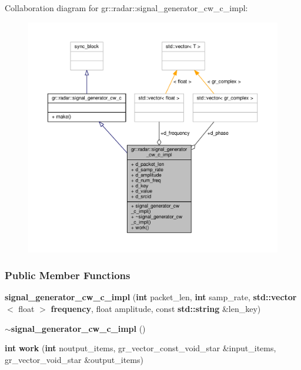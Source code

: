 Collaboration diagram for gr\+:\+:radar\+:\+:signal\+\_\+generator\+\_\+cw\+\_\+c\+\_\+impl\+:
\nopagebreak
\begin{figure}[H]
\begin{center}
\leavevmode
\includegraphics[width=350pt]{d3/d7e/classgr_1_1radar_1_1signal__generator__cw__c__impl__coll__graph}
\end{center}
\end{figure}
\subsubsection*{Public Member Functions}
\begin{DoxyCompactItemize}
\item 
{\bf signal\+\_\+generator\+\_\+cw\+\_\+c\+\_\+impl} ({\bf int} packet\+\_\+len, {\bf int} samp\+\_\+rate, {\bf std\+::vector}$<$ float $>$ {\bf frequency}, float amplitude, const {\bf std\+::string} \&len\+\_\+key)
\item 
{\bf $\sim$signal\+\_\+generator\+\_\+cw\+\_\+c\+\_\+impl} ()
\item 
{\bf int} {\bf work} ({\bf int} noutput\+\_\+items, gr\+\_\+vector\+\_\+const\+\_\+void\+\_\+star \&input\+\_\+items, gr\+\_\+vector\+\_\+void\+\_\+star \&output\+\_\+items)
\end{DoxyCompactItemize}
